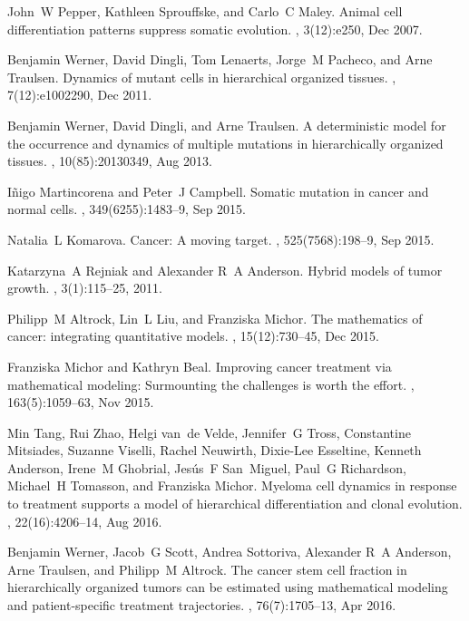 \documentclass[aps,singlecolumn]{revtex4-1}
\begin{document}
\begin{thebibliography}{10}
John~W Pepper, Kathleen Sprouffske, and Carlo~C Maley.
\newblock Animal cell differentiation patterns suppress somatic evolution.
, 3(12):e250, Dec 2007.

Benjamin Werner, David Dingli, Tom Lenaerts, Jorge~M Pacheco, and Arne
  Traulsen.
\newblock Dynamics of mutant cells in hierarchical organized tissues.
, 7(12):e1002290, Dec 2011.

Benjamin Werner, David Dingli, and Arne Traulsen.
\newblock A deterministic model for the occurrence and dynamics of multiple
  mutations in hierarchically organized tissues.
, 10(85):20130349, Aug 2013.

I{\~n}igo Martincorena and Peter~J Campbell.
\newblock Somatic mutation in cancer and normal cells.
, 349(6255):1483--9, Sep 2015.

Natalia~L Komarova.
\newblock Cancer: A moving target.
, 525(7568):198--9, Sep 2015.

Katarzyna~A Rejniak and Alexander R~A Anderson.
\newblock Hybrid models of tumor growth.
, 3(1):115--25, 2011.

Philipp~M Altrock, Lin~L Liu, and Franziska Michor.
\newblock The mathematics of cancer: integrating quantitative models.
, 15(12):730--45, Dec 2015.

Franziska Michor and Kathryn Beal.
\newblock Improving cancer treatment via mathematical modeling: Surmounting the
  challenges is worth the effort.
, 163(5):1059--63, Nov 2015.

Min Tang, Rui Zhao, Helgi van~de Velde, Jennifer~G Tross, Constantine
  Mitsiades, Suzanne Viselli, Rachel Neuwirth, Dixie-Lee Esseltine, Kenneth
  Anderson, Irene~M Ghobrial, Jes{\'u}s~F San~Miguel, Paul~G Richardson,
  Michael~H Tomasson, and Franziska Michor.
\newblock Myeloma cell dynamics in response to treatment supports a model of
  hierarchical differentiation and clonal evolution.
, 22(16):4206--14, Aug 2016.

Benjamin Werner, Jacob~G Scott, Andrea Sottoriva, Alexander R~A Anderson, Arne
  Traulsen, and Philipp~M Altrock.
\newblock The cancer stem cell fraction in hierarchically organized tumors can
  be estimated using mathematical modeling and patient-specific treatment
  trajectories.
, 76(7):1705--13, Apr 2016.


\end{thebibliography}
\end{document}
